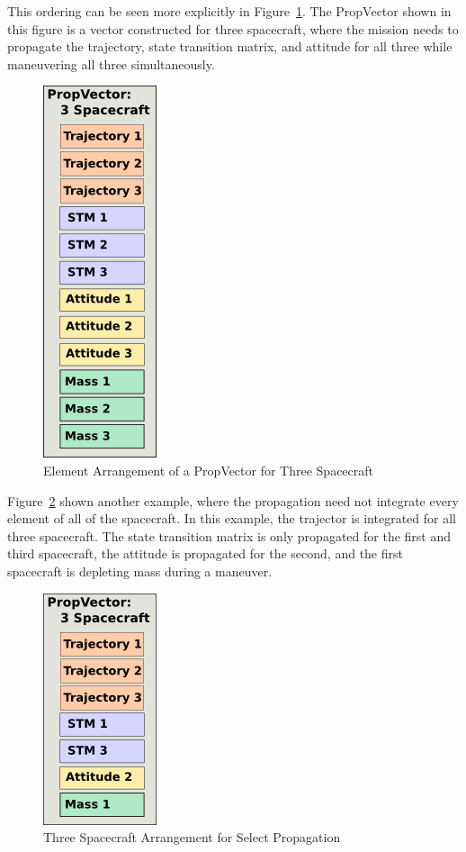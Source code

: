 This ordering can be seen more explicitly in Figure~\ref{figure:ThreeSatPropVector}.  The
PropVector shown in this figure is a vector constructed for three spacecraft, where the mission
needs to propagate the trajectory, state transition matrix, and attitude for all three while
maneuvering all three simultaneously.

\begin{figure}[htb]
\begin{center}
\includegraphics[63,207]{Images/ThreeSatPropVector.png}
\caption{\label{figure:ThreeSatPropVector}Element Arrangement of a PropVector for Three
Spacecraft}
\end{center}
\end{figure}

Figure~\ref{figure:SelectPropVector} shown another example, where the propagation need not
integrate every element of all of the spacecraft.  In this example, the trajector is integrated for
all three spacecraft.  The state transition matrix is only propagated for the first and third
spacecraft, the attitude is propagated for the second, and the first spacecraft is depleting mass
during a maneuver.

\begin{figure}[htb]
\begin{center}
\includegraphics[63,129]{Images/ThreeSatActivePropVector.png}
\caption{\label{figure:SelectPropVector}Three Spacecraft Arrangement for Select
Propagation}
\end{center}
\end{figure}

